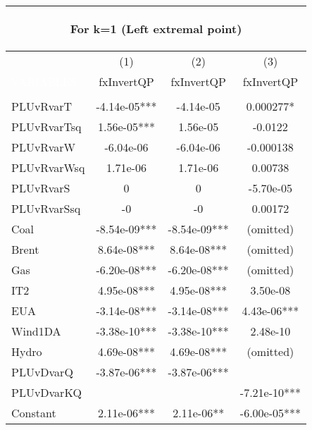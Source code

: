 \begin{center}
\begin{tabular}{lccc}
\multicolumn{4}{c}{\begin{large}For k=1 (Left extremal point) \end{large}} \\ \midrule
 & (1) & (2) & (3) \\
\textcolor{white}{VARIABLES} & fxInvertQP & fxInvertQP & fxInvertQP \\ \midrule
\vspace{4pt} & \begin{footnotesize}\end{footnotesize} & \begin{footnotesize}\end{footnotesize} & \begin{footnotesize}\end{footnotesize} \\
PLUvRvarT & -4.14e-05*** & -4.14e-05 & 0.000277* \\
PLUvRvarTsq & 1.56e-05*** & 1.56e-05 & -0.0122 \\
PLUvRvarW & -6.04e-06 & -6.04e-06 & -0.000138 \\
PLUvRvarWsq & 1.71e-06 & 1.71e-06 & 0.00738 \\
PLUvRvarS & 0 & 0 & -5.70e-05 \\
PLUvRvarSsq & -0 & -0 & 0.00172 \\
Coal & -8.54e-09*** & -8.54e-09*** & (omitted) \\
Brent & 8.64e-08*** & 8.64e-08*** & (omitted) \\
Gas & -6.20e-08*** & -6.20e-08*** & (omitted) \\
IT2 & 4.95e-08*** & 4.95e-08*** & 3.50e-08 \\
EUA & -3.14e-08*** & -3.14e-08*** & 4.43e-06*** \\
Wind1DA & -3.38e-10*** & -3.38e-10*** & 2.48e-10 \\
Hydro & 4.69e-08*** & 4.69e-08*** & (omitted) \\
PLUvDvarQ & -3.87e-06*** & -3.87e-06*** &  \\
PLUvDvarKQ &  &  & -7.21e-10*** \\
Constant & 2.11e-06*** & 2.11e-06** & -6.00e-05*** \\

\end{tabular}
\end{center}
